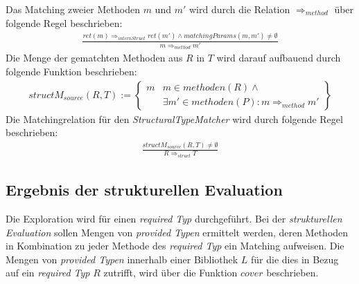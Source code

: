 \noindent
Das Matching zweier Methoden $m$ und $m'$ wird durch die Relation $\Rightarrow_{method}$ über folgende Regel beschrieben:
\begin{gather*}
\frac{\mathit{ret(m)} \Rightarrow_{internStruct} \mathit{ret(m')} \wedge \mathit{matchingParams(m,m')} \neq \emptyset}{m \Rightarrow_{method} m'}
\end{gather*}
\noindent
Die Menge der gematchten Methoden aus $R$ in $T$ wird darauf aufbauend durch folgende Funktion beschrieben:
\begin{gather*}
structM_{source}(R,T) := \left\{ 
				\begin{array}{l|l}
m	& \mathit{m} \in \mathit{methoden(R)} \wedge \mathit{ }
\\
	& \exists \mathit{m'} \in \mathit{methoden(P)} : m \Rightarrow_{method} m'
				\end{array}
              \right\}
\end{gather*}
\noindent
Die Matchingrelation für den \emph{StructuralTypeMatcher} wird durch folgende Regel beschrieben:
\begin{gather*}
\frac{structM_{source}(R,T) \neq \emptyset}{R \Rightarrow_{struct}T}
\end{gather*}


\subsection{Ergebnis der strukturellen Evaluation}\label{sec_ergStructEval}
Die Exploration wird für einen \emph{required Typ} durchgeführt. Bei der \emph{strukturellen Evaluation} sollen Mengen von \emph{provided Typen} ermittelt werden, deren Methoden in Kombination zu jeder Methode des \emph{required Typ} ein Matching aufweisen. Die Mengen von \emph{provided Typen} innerhalb einer Bibliothek $L$ für die dies in Bezug auf ein \emph{required Typ} $R$ zutrifft, wird über die Funktion $cover$ beschrieben.

